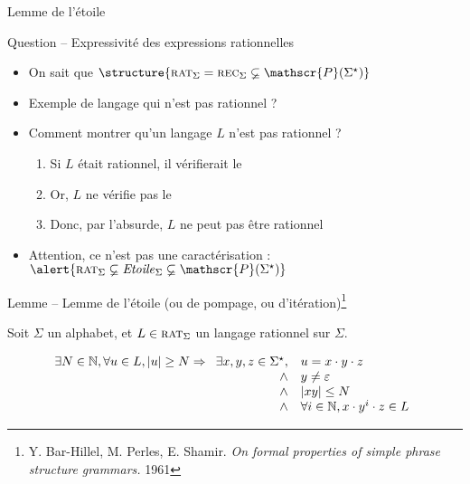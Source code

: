
\begingroup

\begin{frame}{Lemme de l'étoile}

  \begin{block}{Question -- Expressivité des expressions rationnelles}
    \begin{itemize}
    \item On sait que $\structure{\textsc{rat}_\Sigma = \textsc{rec}_\Sigma \varsubsetneq \mathscr{P}(\Sigma^\star)}$
    \item Exemple de langage qui n'est pas rationnel ? 
    \item Comment montrer qu'un langage $L$ n'est pas rationnel ? 
      \begin{enumerate}
      \item Si $L$ était rationnel, il vérifierait le  
      \item Or, $L$ ne vérifie pas le  
      \item Donc, par l'absurde, $L$ ne peut pas être rationnel
      \end{enumerate}
    \item Attention, ce n'est pas une caractérisation : $\alert{\textsc{rat}_\Sigma \varsubsetneq \mathit{Etoile}_\Sigma \varsubsetneq \mathscr{P}(\Sigma^\star)}$
    \end{itemize}
  \end{block}

  \begin{alertblock}{Lemme -- Lemme de l'étoile (ou de pompage, ou d'itération)\footnote[frame, 1]{\scriptsize Y. Bar-Hillel, M. Perles, E. Shamir. \textit{On formal properties of simple phrase structure grammars.} 1961}}

    Soit $\Sigma$ un alphabet, et $L\in \textsc{rat}_\Sigma$ un langage rationnel sur $\Sigma$.

    $$
    \begin{array}{c}
      \exists N\in \mathbb{N}, \forall u\in L, |u| \ge N \Rightarrow
      \begin{array}[t]{rl}
        \exists x, y, z\in \Sigma^\star, &u = x\cdot y \cdot z \\
        \land& y\neq \varepsilon \\
        \land& |xy| \le N\\
        \land& \forall i \in \mathbb{N}, x\cdot y^i \cdot z \in L
      \end{array}
    \end{array}
    $$

  \end{alertblock}

\end{frame}

\endgroup
